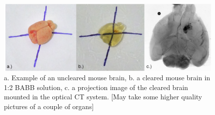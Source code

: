 	\begin{figure}[H]
		\centering
		\includegraphics[width = \textwidth]{meth_img/Brain_J5_clearing.png}
		\caption{a. Example of an uncleared mouse brain, b. a cleared mouse brain in 1:2 BABB solution, c. a projection image of the cleared brain mounted in the optical CT system. [May take some higher quality pictures of a couple of organs]}
		\label{fig:clearing}
	\end{figure}










	
